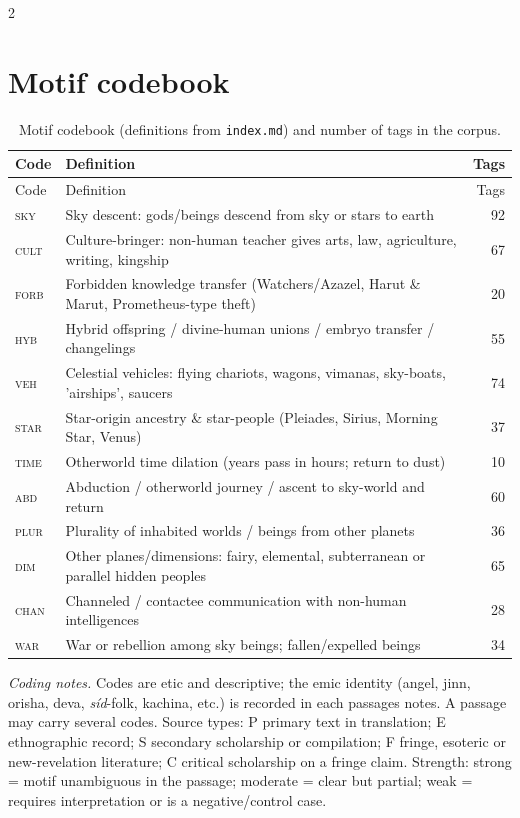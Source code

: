 \documentclass[11pt,a4paper]{article}
\begin{document}
\printbibheading[heading=bibintoc,title={References}]
\begin{multicols}{2}\raggedright
\printbibliography[heading=none]
\end{multicols}

\appendix
\section{Motif codebook}\label{app:codebook}
\begin{longtable}{@{}lp{9.2cm}r@{}}
\caption{Motif codebook (definitions from \texttt{index.md}) and number of tags in the corpus.}\label{tab:codebook}\\
\toprule Code & Definition & Tags \\ \midrule \endfirsthead
\toprule Code & Definition & Tags \\ \midrule \endhead
\bottomrule \endfoot
\textsc{sky} & Sky descent: gods/beings descend from sky or stars to earth & 92 \\
\textsc{cult} & Culture-bringer: non-human teacher gives arts, law, agriculture, writing, kingship & 67 \\
\textsc{forb} & Forbidden knowledge transfer (Watchers/Azazel, Harut \& Marut, Prometheus-type theft) & 20 \\
\textsc{hyb} & Hybrid offspring / divine-human unions / embryo transfer / changelings & 55 \\
\textsc{veh} & Celestial vehicles: flying chariots, wagons, vimanas, sky-boats, 'airships', saucers & 74 \\
\textsc{star} & Star-origin ancestry \& star-people (Pleiades, Sirius, Morning Star, Venus) & 37 \\
\textsc{time} & Otherworld time dilation (years pass in hours; return to dust) & 10 \\
\textsc{abd} & Abduction / otherworld journey / ascent to sky-world and return & 60 \\
\textsc{plur} & Plurality of inhabited worlds / beings from other planets & 36 \\
\textsc{dim} & Other planes/dimensions: fairy, elemental, subterranean or parallel hidden peoples & 65 \\
\textsc{chan} & Channeled / contactee communication with non-human intelligences & 28 \\
\textsc{war} & War or rebellion among sky beings; fallen/expelled beings & 34 \\
\end{longtable}
\noindent\emph{Coding notes.} Codes are etic and descriptive; the emic identity (angel, jinn, orisha, deva, \emph{síd}-folk, kachina, etc.) is recorded in each passages notes. A passage may carry several codes. Source types: P primary text in translation; E ethnographic record; S secondary scholarship or compilation; F fringe, esoteric or new-revelation literature; C critical scholarship on a fringe claim. Strength: strong = motif unambiguous in the passage; moderate = clear but partial; weak = requires interpretation or is a negative/control case.
\end{document}
